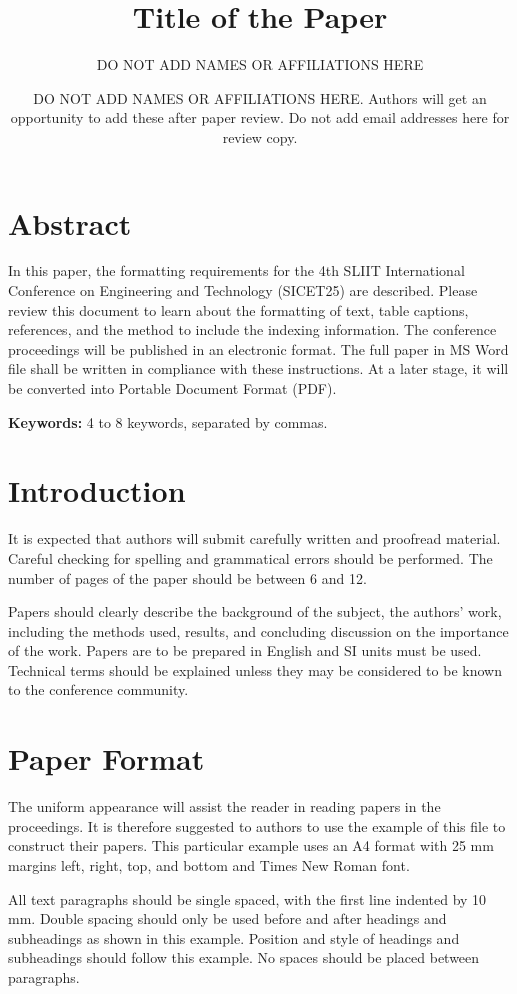 \documentclass[a4paper,11pt]{article}
\title{Title of the Paper}
\author[1]{
DO NOT ADD NAMES OR AFFILIATIONS HERE
}
\author[2]{
DO NOT ADD NAMES OR AFFILIATIONS HERE. Authors will get an opportunity 
to add these after paper review.
Do not add email addresses here for review copy.
}
\affil[1]{Department Name, University Name, City, Country, Email: author1@example.com}
\affil[2]{Department Name, University Name, City, Country, Email: author2@example.com}
\date{}  %
\begin{document}




\section*{Abstract}
In this paper, the formatting requirements for the 4th SLIIT International Conference on Engineering and Technology (SICET25) are described. Please review this document to learn about the formatting of text, table captions, references, and the method to include the indexing information. The conference proceedings will be published in an electronic format. The full paper in MS Word file shall be written in compliance with these instructions. At a later stage, it will be converted into Portable Document Format (PDF).

\textbf{Keywords:} 4 to 8 keywords, separated by commas.

\section{Introduction}
It is expected that authors will submit carefully written and proofread material. Careful checking for spelling and grammatical errors should be performed. The number of pages of the paper should be between 6 and 12.

Papers should clearly describe the background of the subject, the authors' work, including the methods used, results, and concluding discussion on the importance of the work. Papers are to be prepared in English and SI units must be used. Technical terms should be explained unless they may be considered to be known to the conference community. 

\section{Paper Format}
The uniform appearance will assist the reader in reading papers in the proceedings. It is therefore suggested to authors to use the example of this file to construct their papers. This particular example uses an A4 format with 25 mm margins left, right, top, and bottom and Times New Roman font.

All text paragraphs should be single spaced, with the first line indented by 10 mm. Double spacing should only be used before and after headings and subheadings as shown in this example. Position and style of headings and subheadings should follow this example. No spaces should be placed between paragraphs.
\end{document}
